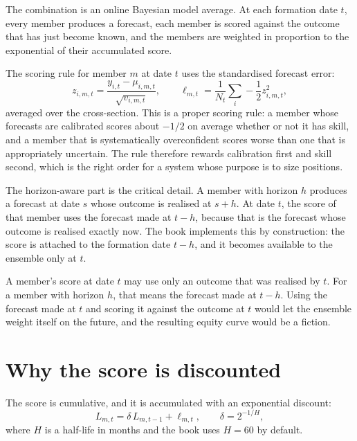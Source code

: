 The combination is an online Bayesian model average. At each formation
date \(t\), every member produces a forecast, each member is scored
against the outcome that has just become known, and the members are
weighted in proportion to the exponential of their accumulated score.

The scoring rule for member \(m\) at date \(t\) uses the standardised
forecast error:
\begin{equation}
z_{i,m,t} = \frac{y_{i,t} - \mu_{i,m,t}}{\sqrt{v_{i,m,t}}},
\qquad
\ell_{m,t} = \frac{1}{N_t}\sum_{i} -\frac{1}{2}z_{i,m,t}^2 ,
\end{equation}
averaged over the cross-section. This is a proper scoring rule: a member
whose forecasts are calibrated scores about \(-1/2\) on average whether or
not it has skill, and a member that is systematically overconfident scores
worse than one that is appropriately uncertain. The rule therefore
rewards calibration first and skill second, which is the right order for
a system whose purpose is to size positions.

The horizon-aware part is the critical detail. A member with horizon \(h\)
produces a forecast at date \(s\) whose outcome is realised at \(s+h\). At
date \(t\), the score of that member uses the forecast made at \(t-h\),
because that is the forecast whose outcome is realised exactly now. The
book implements this by construction: the score is attached to the
formation date \(t-h\), and it becomes available to the ensemble only at
\(t\).

\begin{takeaway}
A member's score at date \(t\) may use only an outcome that was realised
by \(t\). For a member with horizon \(h\), that means the forecast made at
\(t-h\). Using the forecast made at \(t\) and scoring it against the
outcome at \(t\) would let the ensemble weight itself on the future, and
the resulting equity curve would be a fiction.
\end{takeaway}

\section{Why the score is discounted}

The score is cumulative, and it is accumulated with an exponential discount:
\begin{equation}
L_{m,t} = \delta\, L_{m,t-1} + \ell_{m,t},
\qquad
\delta = 2^{-1/H},
\end{equation}
where \(H\) is a half-life in months and the book uses \(H = 60\) by
default.

